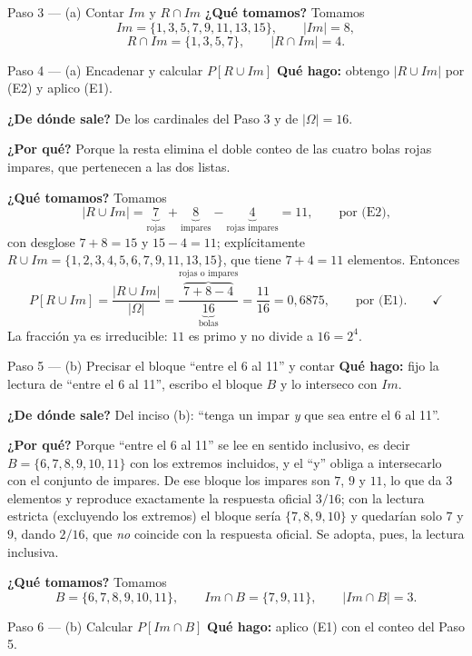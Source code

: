 \documentclass[11pt]{article}
\begin{document}
\begin{sol}
\begin{paso}{Paso 3 --- (a) Contar $Im$ y $R\cap Im$}
\textbf{¿Qué tomamos?} Tomamos
\[
Im=\{1,3,5,7,9,11,13,15\},\qquad |Im|=8,
\]
\[
R\cap Im=\{1,3,5,7\},\qquad |R\cap Im|=4 .
\]
\end{paso}

\begin{paso}{Paso 4 --- (a) Encadenar y calcular $P[R\cup Im]$}
\textbf{Qué hago:} obtengo $|R\cup Im|$ por (E2) y aplico (E1).

\textbf{¿De dónde sale?} De los cardinales del Paso 3 y de $|\Omega|=16$.

\textbf{¿Por qué?} Porque la resta elimina el doble conteo de las cuatro bolas rojas impares,
que pertenecen a las dos listas.

\textbf{¿Qué tomamos?} Tomamos
\[
|R\cup Im|=\underbrace{7}_{\text{rojas}}+\underbrace{8}_{\text{impares}}
-\underbrace{4}_{\text{rojas impares}}=11 , \qquad\text{por (E2),}
\]
con desglose $7+8=15$ y $15-4=11$; explícitamente
$R\cup Im=\{1,2,3,4,5,6,7,9,11,13,15\}$, que tiene $7+4=11$ elementos. Entonces
\[
P[R\cup Im]=\frac{|R\cup Im|}{|\Omega|}
=\frac{\overbrace{7+8-4}^{\text{rojas o impares}}}{\underbrace{16}_{\text{bolas}}}
=\frac{11}{16}=0{,}6875 , \qquad\text{por (E1)} . \qquad\checkmark
\]
La fracción ya es irreducible: $11$ es primo y no divide a $16=2^{4}$.
\end{paso}

\begin{paso}{Paso 5 --- (b) Precisar el bloque ``entre el 6 al 11'' y contar}
\textbf{Qué hago:} fijo la lectura de ``entre el 6 al 11'', escribo el bloque $B$ y lo interseco
con $Im$.

\textbf{¿De dónde sale?} Del inciso (b): ``tenga un impar \emph{y} que sea entre el 6 al 11''.

\textbf{¿Por qué?} Porque ``entre el 6 al 11'' se lee en sentido inclusivo, es decir
$B=\{6,7,8,9,10,11\}$ con los extremos incluidos, y el ``y'' obliga a intersecarlo con el
conjunto de impares. De ese bloque los impares son $7$, $9$ y $11$, lo que da $3$ elementos y
reproduce exactamente la respuesta oficial $3/16$; con la lectura estricta (excluyendo los
extremos) el bloque sería $\{7,8,9,10\}$ y quedarían solo $7$ y $9$, dando $2/16$, que \emph{no}
coincide con la respuesta oficial. Se adopta, pues, la lectura inclusiva.

\textbf{¿Qué tomamos?} Tomamos
\[
B=\{6,7,8,9,10,11\},\qquad
Im\cap B=\{7,9,11\},\qquad |Im\cap B|=3 .
\]
\end{paso}

\begin{paso}{Paso 6 --- (b) Calcular $P[Im\cap B]$}
\textbf{Qué hago:} aplico (E1) con el conteo del Paso 5.


\end{paso}
\end{sol}
\end{document}
